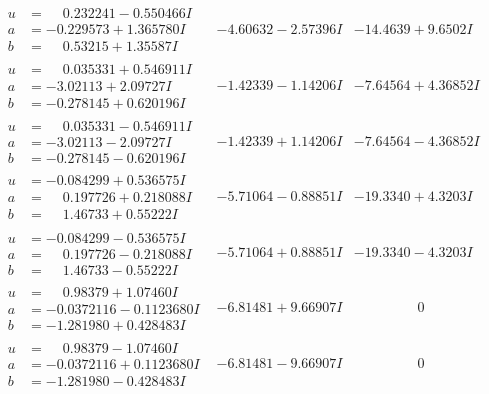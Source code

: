 \documentclass[1p]{elsarticle_modified}
\theoremstyle{definition}
\begin{document}
$$\begin{array}{c|c|c}
\begin{aligned}
u &= \phantom{-}0.232241 - 0.550466 I \\
a &= -0.229573 + 1.365780 I \\
b &= \phantom{-}0.53215 + 1.35587 I\end{aligned}
 & -4.60632 - 2.57396 I & -14.4639 + 9.6502 I \\ \hline\begin{aligned}
u &= \phantom{-}0.035331 + 0.546911 I \\
a &= -3.02113 + 2.09727 I \\
b &= -0.278145 + 0.620196 I\end{aligned}
 & -1.42339 - 1.14206 I & -7.64564 + 4.36852 I \\ \hline\begin{aligned}
u &= \phantom{-}0.035331 - 0.546911 I \\
a &= -3.02113 - 2.09727 I \\
b &= -0.278145 - 0.620196 I\end{aligned}
 & -1.42339 + 1.14206 I & -7.64564 - 4.36852 I \\ \hline\begin{aligned}
u &= -0.084299 + 0.536575 I \\
a &= \phantom{-}0.197726 + 0.218088 I \\
b &= \phantom{-}1.46733 + 0.55222 I\end{aligned}
 & -5.71064 - 0.88851 I & -19.3340 + 4.3203 I \\ \hline\begin{aligned}
u &= -0.084299 - 0.536575 I \\
a &= \phantom{-}0.197726 - 0.218088 I \\
b &= \phantom{-}1.46733 - 0.55222 I\end{aligned}
 & -5.71064 + 0.88851 I & -19.3340 - 4.3203 I \\ \hline\begin{aligned}
u &= \phantom{-}0.98379 + 1.07460 I \\
a &= -0.0372116 - 0.1123680 I \\
b &= -1.281980 + 0.428483 I\end{aligned}
 & -6.81481 + 9.66907 I & \phantom{-0.000000 } 0 \\ \hline\begin{aligned}
u &= \phantom{-}0.98379 - 1.07460 I \\
a &= -0.0372116 + 0.1123680 I \\
b &= -1.281980 - 0.428483 I\end{aligned}
 & -6.81481 - 9.66907 I & \phantom{-0.000000 } 0 \\ \hline\begin{aligned}

\end{aligned}
\end{array}$$
\end{document}

